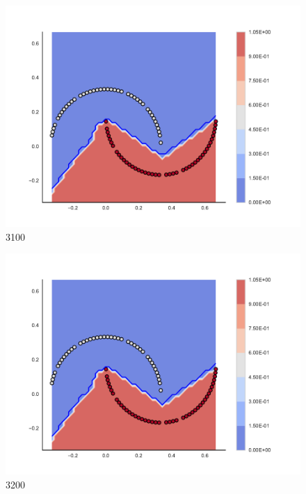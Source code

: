 \begin{subfigure}[b]{0.09\textwidth}
    \includegraphics[clip, trim=2.35cm 1.75cm 4.5cm 0cm,width=\textwidth]{img/convergence/3100.pdf}
    \caption{3100}
    \label{fig:convergence_3100}
\end{subfigure}
%
\begin{subfigure}[b]{0.09\textwidth}
    \includegraphics[clip, trim=2.35cm 1.75cm 4.5cm 0cm,width=\textwidth]{img/convergence/3200.pdf}
    \caption{3200}
    \label{fig:convergence_3200}
\end{subfigure}
%
